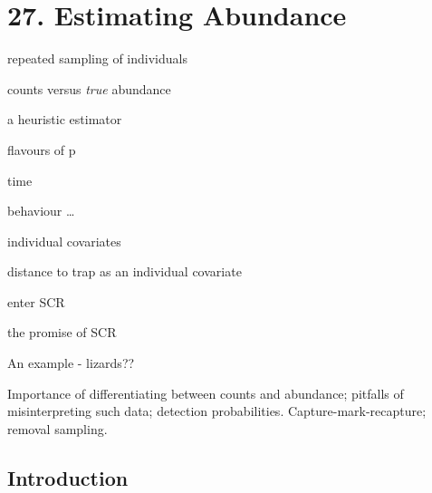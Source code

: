\documentclass{book}
\begin{document}
\chapter*{27. Estimating Abundance\\
          }
\begin{itemize}
\item{repeated sampling of individuals}
\item{counts versus \emph{true} abundance}
\item{a heuristic estimator}
\item{flavours of p
  \item{time}
  \item{behaviour}
  \ldots
  \item{individual covariates}
}
\item{distance to trap as an individual covariate}
\item{enter SCR}
\item{the promise of SCR}
\item{An example - lizards??}


\end{itemize}
Importance of differentiating between counts and abundance; pitfalls of misinterpreting such data; detection probabilities. Capture-mark-recapture; removal sampling.


\section{Introduction}
\end{document}
